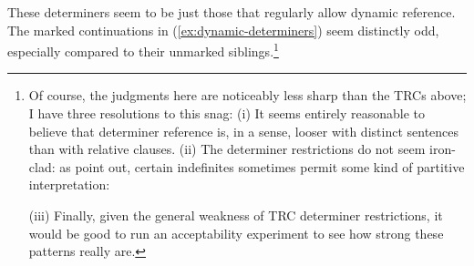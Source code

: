 \documentclass[11pt]{article}
\begin{document}
These determiners seem to be just those that regularly allow dynamic reference. The marked continuations in (\ref{ex:dynamic-determiners}) seem distinctly odd, especially compared to their unmarked siblings.\footnote{Of course, the judgments here are noticeably less sharp than the TRCs above; I have three resolutions to this snag: (i) It seems entirely reasonable to believe that determiner reference is, in a sense, looser with distinct sentences than with relative clauses. (ii) The determiner restrictions do not seem iron-clad: as \citet{grosuAmountRelatives2017} point out, certain indefinites sometimes permit some kind of partitive interpretation:
	\begin{exe}
	\end{exe}
	(iii) Finally, given the general weakness of TRC determiner restrictions, it would be good to run an acceptability experiment to see how strong these patterns really are.}

\begin{exe}
	\label{ex:dynamic-determiners}
\end{exe}
\end{document}

